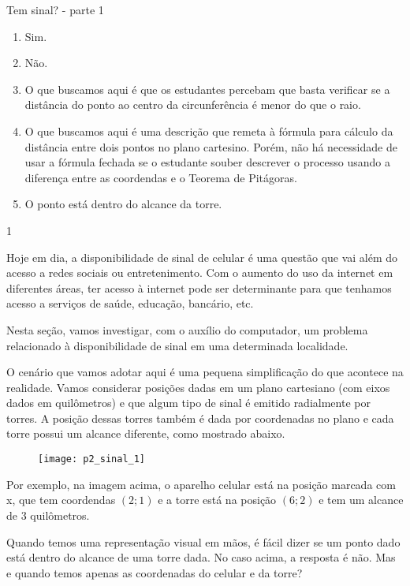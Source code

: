 \begin{answer}{Tem sinal? - parte 1}
{
\begin{enumerate}
\item Sim.

\item Não.

\item O que buscamos aqui é que os estudantes percebam que basta verificar se a distância do ponto ao centro da circunferência é menor do que o raio.

\item O que buscamos aqui é uma descrição que remeta à fórmula para cálculo da distância entre dois pontos no plano cartesino. Porém, não há necessidade de usar a fórmula fechada se o estudante souber descrever o processo usando a diferença entre as coordendas e o Teorema de Pitágoras.

\item O ponto está dentro do alcance da torre.
\end{enumerate}
}{1}
\end{answer}

Hoje em dia, a disponibilidade de sinal de celular é uma questão que vai além do acesso a redes sociais ou entretenimento. Com o aumento do uso da internet em diferentes áreas, ter acesso à internet pode ser determinante para que tenhamos acesso a serviços de saúde, educação, bancário, etc.

Nesta seção, vamos investigar, com o auxílio do computador, um problema relacionado à disponibilidade de sinal em uma determinada localidade.

O cenário que vamos adotar aqui é uma pequena simplificação do que acontece na realidade. Vamos considerar posições dadas em um plano cartesiano (com eixos dados em quilômetros) e que algum tipo de sinal é emitido radialmente por torres. A posição dessas torres também é dada por coordenadas no plano e cada torre possui um alcance diferente, como mostrado abaixo.

\begin{figure}[H]
\centering

\texttt{[image: p2\_sinal\_1]}
\end{figure}

Por exemplo, na imagem acima, o aparelho celular está na posição marcada com x, que tem coordendas $(2;1)$ e a torre está na posição $(6;2)$ e tem um alcance de $3$ quilômetros.

Quando temos uma representação visual em mãos, é fácil dizer se um ponto dado está dentro do alcance de uma torre dada. No caso acima, a resposta é não. Mas e quando temos apenas as coordenadas do celular e da torre?


